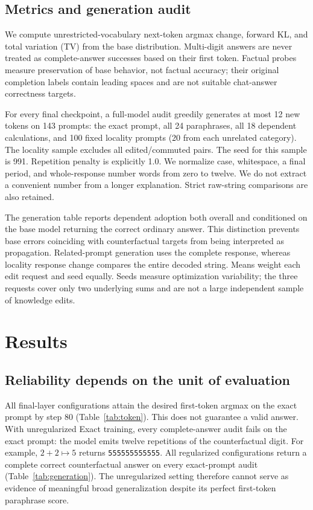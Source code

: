 \documentclass[10pt,twocolumn]{article}
\begin{document}
\subsection{Metrics and generation audit}
We compute unrestricted-vocabulary next-token argmax change, forward KL, and total variation (TV) from the base distribution. Multi-digit answers are never treated as complete-answer successes based on their first token. Factual probes measure preservation of base behavior, not factual accuracy; their original completion labels contain leading spaces and are not suitable chat-answer correctness targets.

For every final checkpoint, a full-model audit greedily generates at most 12 new tokens on 143 prompts: the exact prompt, all 24 paraphrases, all 18 dependent calculations, and 100 fixed locality prompts (20 from each unrelated category). The locality sample excludes all edited/commuted pairs. The seed for this sample is 991. Repetition penalty is explicitly 1.0. We normalize case, whitespace, a final period, and whole-response number words from zero to twelve. We do not extract a convenient number from a longer explanation. Strict raw-string comparisons are also retained.

The generation table reports dependent adoption both overall and conditioned on the base model returning the correct ordinary answer. This distinction prevents base errors coinciding with counterfactual targets from being interpreted as propagation. Related-prompt generation uses the complete response, whereas locality response change compares the entire decoded string. Means weight each edit request and seed equally. Seeds measure optimization variability; the three requests cover only two underlying sums and are not a large independent sample of knowledge edits.

\section{Results}
\subsection{Reliability depends on the unit of evaluation}
All final-layer configurations attain the desired first-token argmax on the exact prompt by step 80 (Table~\ref{tab:token}). This does not guarantee a valid answer. With unregularized Exact training, every complete-answer audit fails on the exact prompt: the model emits twelve repetitions of the counterfactual digit. For example, $2+2\mapsto5$ returns \texttt{555555555555}. All regularized configurations return a complete correct counterfactual answer on every exact-prompt audit (Table~\ref{tab:generation}). The unregularized setting therefore cannot serve as evidence of meaningful broad generalization despite its perfect first-token paraphrase score.
\end{document}
